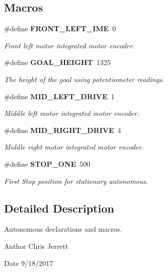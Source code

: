 \subsection*{Macros}
\begin{DoxyCompactItemize}
\item 
\#define \textbf{ F\+R\+O\+N\+T\+\_\+\+L\+E\+F\+T\+\_\+\+I\+ME}~0
\begin{DoxyCompactList}\small\item\em Front left motor integrated motor encoder. \end{DoxyCompactList}\item 
\#define \textbf{ G\+O\+A\+L\+\_\+\+H\+E\+I\+G\+HT}~1325
\begin{DoxyCompactList}\small\item\em The height of the goal using potentiometer readings. \end{DoxyCompactList}\item 
\#define \textbf{ M\+I\+D\+\_\+\+L\+E\+F\+T\+\_\+\+D\+R\+I\+VE}~1
\begin{DoxyCompactList}\small\item\em Middle left motor integrated motor encoder. \end{DoxyCompactList}\item 
\#define \textbf{ M\+I\+D\+\_\+\+R\+I\+G\+H\+T\+\_\+\+D\+R\+I\+VE}~4
\begin{DoxyCompactList}\small\item\em Middle right motor integrated motor encoder. \end{DoxyCompactList}\item 
\#define \textbf{ S\+T\+O\+P\+\_\+\+O\+NE}~500
\begin{DoxyCompactList}\small\item\em First Stop position for stationary autonomous. \end{DoxyCompactList}\end{DoxyCompactItemize}


\subsection{Detailed Description}
Autonomous declarations and macros. 

\begin{DoxyAuthor}{Author}
Chris Jerrett 
\end{DoxyAuthor}
\begin{DoxyDate}{Date}
9/18/2017 
\end{DoxyDate}


